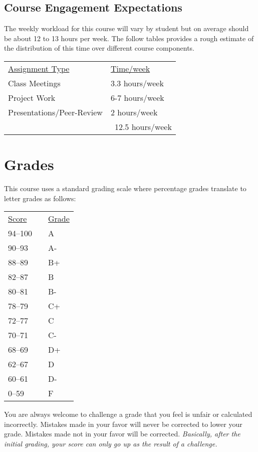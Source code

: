 \documentclass[10pt]{article}
\begin{document}
\subsection{Course Engagement Expectations}

The weekly workload for this course will vary by student but on average should be about 12 to 13 hours per week.  The follow tables provides a rough estimate of the distribution of this time over different course components.
\begin{center}
\begin{tabular}{ll}
\underline{Assignment Type} & \underline{Time/week} \\
Class Meetings       & 3.3 hours/week \\
Project Work          & 6-7 hours/week \\
Presentations/Peer-Review   & 2 hours/week \\
\bottomrule
 & ~12.5 hours/week
\end{tabular}
\end{center}

\section{Grades}

This course uses a standard grading scale where percentage grades translate to letter grades as follows:

\begin{center}
\begin{small}
\begin{tabular}{lcl}
\underline{Score} & & \underline{Grade} \\
94--100 & & A \\
90--93 & & A- \\
88--89 & & B+ \\
82--87 & & B \\
80--81 & & B- \\
78--79 & & C+ \\
72--77 & & C \\
70--71 & & C- \\
68--69 & & D+ \\
62--67 & & D \\
60--61 & & D- \\
0--59 & & F
\end{tabular}
\end{small}
\end{center}


You are always welcome to challenge a grade that you feel is unfair or calculated incorrectly.  Mistakes made in your favor will never be corrected to lower your grade.  Mistakes made not in your favor will be corrected.  \textit{Basically, after the initial grading, your score can only go up as the result of a challenge.}
\end{document}
